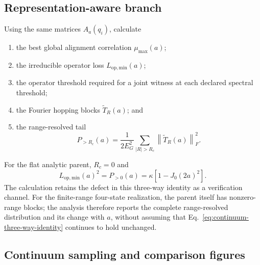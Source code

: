 \documentclass[11pt]{article}
\newcommand{\norm}[1]{\left\lVert #1\right\rVert}
\begin{document}
\subsection{Representation-aware branch}

Using the same matrices $A_a(q_i)$, calculate
\begin{enumerate}[label=\arabic*.]
  \item the best global alignment correlation $\mu_{\max}(a)$;
  \item the irreducible operator loss
        $L_{\mathrm{op,min}}(a)$;
  \item the operator threshold required for a joint witness at each declared spectral
        threshold;
  \item the Fourier hopping blocks $\widetilde T_R(a)$; and
  \item the range-resolved tail
        \begin{equation}
        P_{>R_c}(a)=\frac{1}{2E_G^2}
        \sum_{|R|>R_c}\norm{\widetilde T_R(a)}_F^2.
        \label{eq:continuum-hopping-tail}
        \end{equation}
\end{enumerate}
For the flat analytic parent, $R_c=0$ and
\begin{equation}
 L_{\mathrm{op,min}}(a)^2=P_{>0}(a)
 =\kappa\left[1-J_0(2a)^2\right].
 \label{eq:continuum-three-way-identity}
\end{equation}
The calculation retains the defect in this three-way identity as a verification channel.
For the finite-range four-state realization, the parent itself has nonzero-range blocks;
the analysis therefore reports the complete range-resolved distribution and its change
with $a$, without assuming that Eq.~\eqref{eq:continuum-three-way-identity} continues to
hold unchanged.

\subsection{Continuum sampling and comparison figures}
\end{document}
